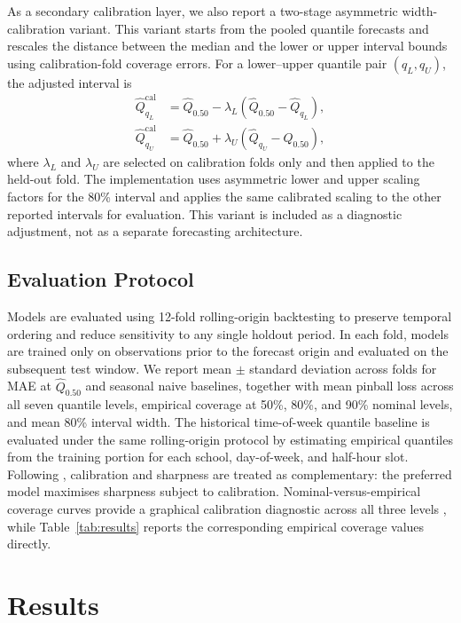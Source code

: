 \documentclass[12pt,a4paper]{article}
\begin{document}
As a secondary calibration layer, we also report a two-stage asymmetric width-calibration variant. This variant starts from the pooled quantile forecasts and rescales the distance between the median and the lower or upper interval bounds using calibration-fold coverage errors. For a lower--upper quantile pair $(q_L,q_U)$, the adjusted interval is
\begin{align}
\hat{Q}^{\mathrm{cal}}_{q_L} &= \hat{Q}_{0.50} - \lambda_L\left(\hat{Q}_{0.50}-\hat{Q}_{q_L}\right),\\
\hat{Q}^{\mathrm{cal}}_{q_U} &= \hat{Q}_{0.50} + \lambda_U\left(\hat{Q}_{q_U}-\hat{Q}_{0.50}\right),
\end{align}
where $\lambda_L$ and $\lambda_U$ are selected on calibration folds only and then applied to the held-out fold. The implementation uses asymmetric lower and upper scaling factors for the 80\% interval and applies the same calibrated scaling to the other reported intervals for evaluation. This variant is included as a diagnostic adjustment, not as a separate forecasting architecture.

\subsection{Evaluation Protocol}

Models are evaluated using 12-fold rolling-origin backtesting to preserve temporal ordering and reduce sensitivity to any single holdout period. In each fold, models are trained only on observations prior to the forecast origin and evaluated on the subsequent test window. We report mean $\pm$ standard deviation across folds for MAE at $\hat{Q}_{0.50}$ and seasonal naive baselines, together with mean pinball loss across all seven quantile levels, empirical coverage at 50\%, 80\%, and 90\% nominal levels, and mean 80\% interval width. The historical time-of-week quantile baseline is evaluated under the same rolling-origin protocol by estimating empirical quantiles from the training portion for each school, day-of-week, and half-hour slot. Following \citet{gneitingbal2007}, calibration and sharpness are treated as complementary: the preferred model maximises sharpness subject to calibration. Nominal-versus-empirical coverage curves provide a graphical calibration diagnostic across all three levels \citep{haben2021}, while Table~\ref{tab:results} reports the corresponding empirical coverage values directly.


\section{Results}
\end{document}
